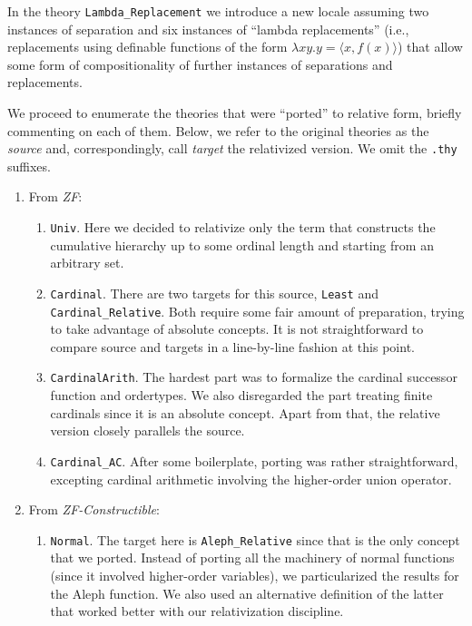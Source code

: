 \documentclass[11pt,a4paper,english]{article}
\newcommand{\session}[1]{\textit{#1}}
\newcommand{\theory}[1]{\texttt{#1}}
\begin{document}
In the theory \theory{Lambda\_Replacement} we introduce a new locale assuming
two instances of separation and six instances of ``lambda replacements''
(i.e., replacements using definable functions of the form $\lambda x y. y=\langle x, f(x) \rangle$)
that allow some form of compositionality of further instances
of separations and replacements.

We proceed to enumerate the theories that were ``ported'' to relative
form, briefly commenting on each of them. Below, we refer to the
original theories as the \emph{source} and, correspondingly, call
\emph{target} the relativized version. We omit the \theory{.thy}
suffixes.

\begin{enumerate}
\item From \session{ZF}:
  \begin{enumerate}
  \item \theory{Univ}. Here we decided to relativize only the term
     that constructs the cumulative hierarchy up to some
    ordinal length and starting from an arbitrary set.
  \item \theory{Cardinal}. There are two targets for this source,
    \theory{Least} and \theory{Cardinal\_Relative}. Both require some
    fair amount of preparation, trying to take advantage of absolute
    concepts. It is not straightforward to compare source and targets
    in a line-by-line fashion at this point.
  \item \theory{CardinalArith}. The hardest part was to formalize the
    cardinal successor function and ordertypes.
    We also disregarded the part treating
    finite cardinals since it is an absolute concept. Apart from that,
    the relative version closely parallels the source.
  \item \theory{Cardinal\_AC}. After some boilerplate, porting was
    rather straightforward, excepting cardinal arithmetic involving
    the higher-order union operator.
  \end{enumerate}
\item From \session{ZF-Constructible}:
  \begin{enumerate}
  \item \theory{Normal}. The target here is \theory{Aleph\_Relative}
    since that is the only concept that we ported. Instead of porting
    all the machinery of normal functions (since it involved
    higher-order variables), we particularized the results for the
    Aleph function. We also used an alternative definition of the
    latter that worked better with our relativization discipline.

\end{enumerate}
\end{enumerate}
\end{document}
